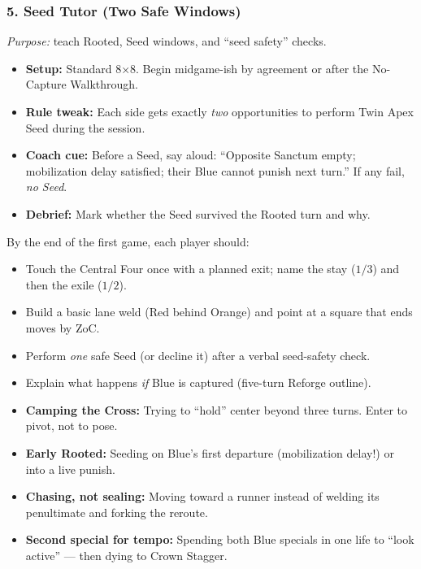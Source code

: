 \documentclass[11pt]{article}
\begin{document}
\subsubsection*{5. Seed Tutor (Two Safe Windows)}
\textit{Purpose:} teach Rooted, Seed windows, and “seed safety” checks.
\begin{itemize}[leftmargin=1.3em]
  \item \textbf{Setup:} Standard 8×8. Begin midgame-ish by agreement or after the No-Capture Walkthrough.
  \item \textbf{Rule tweak:} Each side gets exactly \emph{two} opportunities to perform Twin Apex Seed during the session.
  \item \textbf{Coach cue:} Before a Seed, say aloud: “Opposite Sanctum empty; mobilization delay satisfied; their Blue cannot punish next turn.” If any fail, \emph{no Seed}.
  \item \textbf{Debrief:} Mark whether the Seed survived the Rooted turn and why.
\end{itemize}

\begin{rulevariant}[title={First-Session Goals (Say These Out Loud)}]
By the end of the first game, each player should:
\begin{itemize}\itemsep0.2em
  \item Touch the Central Four once with a planned exit; name the stay (\(1/3\)) and then the exile (\(1/2\)).
  \item Build a basic lane weld (Red behind Orange) and point at a square that ends moves by ZoC.
  \item Perform \emph{one} safe Seed (or decline it) after a verbal seed-safety check.
  \item Explain what happens \emph{if} Blue is captured (five-turn Reforge outline).
\end{itemize}
\end{rulevariant}

\begin{rulevariant}[title={Common New-Player Pitfalls (Spot \& Stop)}]
\begin{itemize}\itemsep0.2em
  \item \textbf{Camping the Cross:} Trying to “hold” center beyond three turns. Enter to pivot, not to pose.
  \item \textbf{Early Rooted:} Seeding on Blue’s first departure (mobilization delay!) or into a live punish.
  \item \textbf{Chasing, not sealing:} Moving toward a runner instead of welding its penultimate and forking the reroute.
  \item \textbf{Second special for tempo:} Spending both Blue specials in one life to “look active” — then dying to Crown Stagger.
\end{itemize}
\end{rulevariant}
\end{document}
